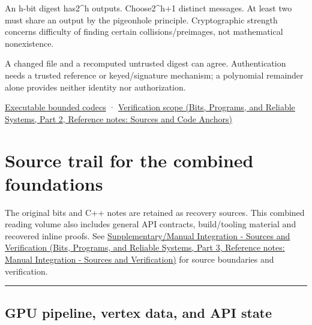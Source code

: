 \hypertarget{03-visual-computing-i-ch018-a-digest-cannot-be-injective-on-unrestricted-messages}{}

An h-bit digest has2\^{}h outputs. Choose2\^{}h+1 distinct messages. At least two must share an output by the pigeonhole principle. Cryptographic strength concerns difficulty of finding certain collisions/preimages, not mathematical nonexistence.

A changed file and a recomputed untrusted digest can agree. Authentication needs a trusted reference or keyed/signature mechanism; a polynomial remainder alone provides neither identity nor authorization.

\hyperref[appendix-4e2236f53445-representation-codecs-and-bounded-file-laboratory]{Executable bounded codecs} · \href{../01-Bits-Programs-and-Reliable-Systems-P02/main.pdf\#nameddest=appendix-a103e7846d21}{Verification scope (Bits, Programs, and Reliable Systems, Part 2, Reference notes: Sources and Code Anchors)}

\section{Source trail for the combined foundations}\label{03-visual-computing-i-ch018-source-trail-for-the-combined-foundations}

\hypertarget{03-visual-computing-i-ch018-source-trail-for-the-combined-foundations}{}

The original bits and C++ notes are retained as recovery sources. This combined reading volume also includes general API contracts, build/tooling material and recovered inline proofs. See \href{../01-Bits-Programs-and-Reliable-Systems-P03/main.pdf\#nameddest=appendix-3b67654799a2}{Supplementary/Manual Integration - Sources and Verification (Bits, Programs, and Reliable Systems, Part 3, Reference notes: Manual Integration - Sources and Verification)} for source boundaries and verification.

\begin{center}\rule{0.5\linewidth}{0.5pt}\end{center}

\subsection{GPU pipeline, vertex data, and API state}\label{03-visual-computing-i-ch018-gpu-pipeline-vertex-data-and-api-state}

\hypertarget{03-visual-computing-i-ch018-gpu-pipeline-vertex-data-and-api-state}{}

